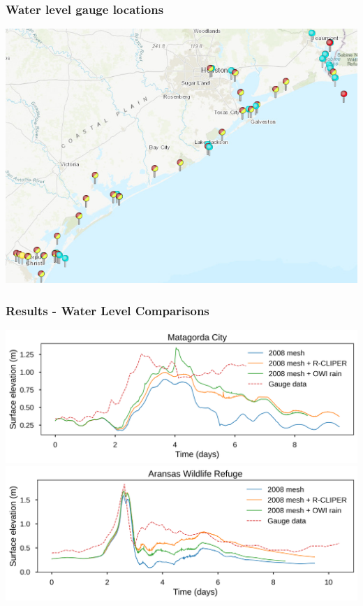 \documentclass[10pt]{oden_beamer}
\begin{document}
\begin{frame}
  \frametitle{Water level gauge locations}
  \centering
  \includegraphics[width=0.9\linewidth]{stations2.png}
\end{frame}

\begin{frame}
  \frametitle{Results - Water Level Comparisons}
  \centering
  \includegraphics[width=0.9\linewidth]{matagorda.png}
  \centering
  \includegraphics[width=0.9\linewidth]{aransas_wildlife.png}
\end{frame}
\end{document}
